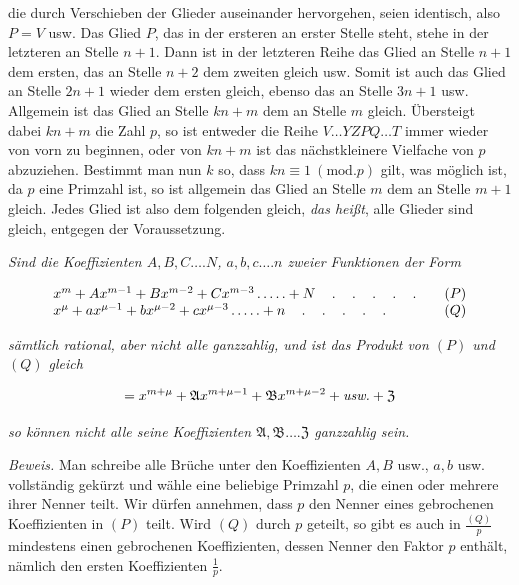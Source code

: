 \noindent die durch Verschieben der Glieder auseinander hervorgehen, seien identisch, also $P=V$ usw. Das Glied $P$, das in der ersteren an erster Stelle steht, stehe in der letzteren an Stelle $n+1$. Dann ist in der letzteren Reihe das Glied an Stelle $n+1$ dem ersten, das an Stelle $n+2$ dem zweiten gleich usw. Somit ist auch das Glied an Stelle $2n+1$ wieder dem ersten gleich, ebenso das an Stelle $3n+1$ usw. Allgemein ist das Glied an Stelle $kn+m$ dem an Stelle $m$ gleich. Übersteigt dabei $kn+m$ die Zahl $p$, so ist entweder die Reihe $V\ldots YZPQ\ldots T$ immer wieder von vorn zu beginnen, oder von $kn+m$ ist das nächstkleinere Vielfache von $p$ abzuziehen. Bestimmt man nun $k$ so, dass $kn\equiv1\ (\mathrm{mod.}p)$ gilt, was möglich ist, da $p$ eine Primzahl ist, so ist allgemein das Glied an Stelle $m$ dem an Stelle $m+1$ gleich. Jedes Glied ist also dem folgenden gleich, \emph{das heißt}, alle Glieder sind gleich, entgegen der Voraussetzung.


\emph{Sind die Koeffizienten $A,B,C\ldots.N$, $a,b,c\ldots.n$ zweier Funktionen der Form}

\[
\begin{array}{l@{\qquad}c}
x^m+Ax^{m-1}+Bx^{m-2}+Cx^{m-3}\mathinner{\ldotp\ldotp\ldotp\ldotp\ldotp}+N
\quad\mathinner{\ldotp\quad\ldotp\quad\ldotp\quad\ldotp\quad\ldotp}&(P)\\
x^\mu+ax^{\mu-1}+bx^{\mu-2}+cx^{\mu-3}\mathinner{\ldotp\ldotp\ldotp\ldotp\ldotp}+n
\quad\mathinner{\ldotp\quad\ldotp\quad\ldotp\quad\ldotp\quad\ldotp}&(Q)
\end{array}
\]

\noindent\emph{sämtlich rational, aber nicht alle ganzzahlig, und ist das Produkt von $(P)$ und $(Q)$ gleich}

\[=x^{m+\mu}+\mathfrak{A}x^{m+\mu-1}+\mathfrak{B}x^{m+\mu-2}+\emph{usw.}+\mathfrak{Z}\]

\noindent\emph{so können nicht alle seine Koeffizienten $\mathfrak{A},\mathfrak{B}\ldots.\mathfrak{Z}$ ganzzahlig sein.}

\emph{Beweis.} Man schreibe alle Brüche unter den Koeffizienten $A,B$ usw., $a,b$ usw. vollständig gekürzt und wähle eine beliebige Primzahl $p$, die einen oder mehrere ihrer Nenner teilt. Wir dürfen annehmen, dass $p$ den Nenner eines gebrochenen Koeffizienten in $(P)$ teilt. Wird $(Q)$ durch $p$ geteilt, so gibt es auch in $\frac{(Q)}{p}$ mindestens einen gebrochenen Koeffizienten, dessen Nenner den Faktor $p$ enthält, nämlich den ersten Koeffizienten $\frac{1}{p}$.

